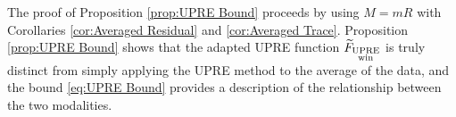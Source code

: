 \documentclass[12pt]{article}
\begin{document}
\noindent The proof of Proposition \ref{prop:UPRE Bound} proceeds by using $M = mR$ with Corollaries \ref{cor:Averaged Residual} and \ref{cor:Averaged Trace}. Proposition \ref{prop:UPRE Bound} shows that the adapted UPRE function $\widetilde{F}_{\substack{\text{UPRE} \\ \text{win}}}$ is truly distinct from simply applying the UPRE method to the average of the data, and the bound \eqref{eq:UPRE Bound} provides a description of the relationship between the two modalities.
\end{document}
